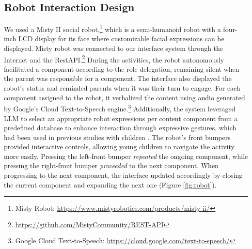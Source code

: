 \subsection{Robot Interaction Design}
We used a Misty II social robot,\footnote{Misty Robot: \url{https://www.mistyrobotics.com/products/misty-ii/}} which is a semi-humanoid robot with a four-inch LCD display for its face where customizable facial expressions can be displayed. Misty robot was connected to our interface system through the Internet and the RestAPI.\footnote{\url{https://github.com/MistyCommunity/REST-API}} During the activities, the robot autonomously facilitated a component according to the role delegation, remaining silent when the parent was responsible for a component. The interface also displayed the robot's status and reminded parents when it was their turn to engage. For each component assigned to the robot, it verbalized the content using audio generated by Google's Cloud Text-to-Speech engine.\footnote{Google Cloud Text-to-Speech: \url{https://cloud.google.com/text-to-speech/}} Additionally, the system leveraged LLM to select an appropriate robot expressions per content component from a predefined database to enhance interaction through expressive gestures, which had been used in previous studies with children \cite{white2021designing}. The robot's front bumpers provided interactive controls, allowing young children to navigate the activity more easily. Pressing the left-front bumper \textit{repeated} the ongoing component, while pressing the right-front bumper \textit{proceeded} to the next component. When progressing to the next component, the interface updated accordingly by closing the current component and expanding the next one (Figure \ref{fig:robot}).






